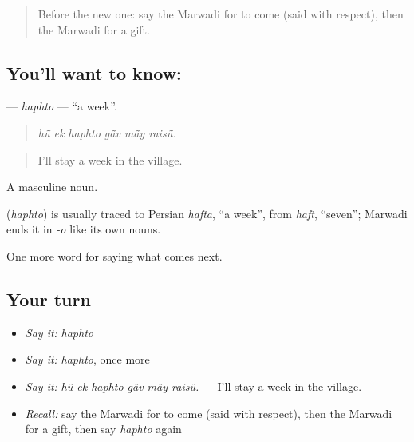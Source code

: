 \label{lesson:MW-C219-haphto}



\begin{quote}
Before the new one: say the Marwadi for to come (said with respect), then the Marwadi for a gift.
\end{quote}

\subsection*{You'll want to know: }
\textbf{} — \emph{haphto} — \textquotedblleft{}a week\textquotedblright{}.

\begin{quote}
     
\end{quote}

\begin{quote}
\emph{hū̃ ek haphto gā̃v mā̃y raisū̃.}
\end{quote}

\begin{quote}
I'll stay a week in the village.
\end{quote}

A masculine noun.

\begin{cousinweb}
\textbf{} (\emph{haphto}) is usually traced to Persian \emph{hafta}, \textquotedblleft{}a week\textquotedblright{}, from \emph{haft}, \textquotedblleft{}seven\textquotedblright{}; Marwadi ends it in \emph{-o} like its own nouns.
\end{cousinweb}

\begin{grammarlens}[title={What you've built}]
One more word for saying what comes next.
\end{grammarlens}

\subsection*{Your turn}
\begin{itemize}
\raggedright
  \item \emph{Say it:} \emph{haphto}
  \item \emph{Say it:} \emph{haphto}, once more
  \item \emph{Say it:} \emph{hū̃ ek haphto gā̃v mā̃y raisū̃.} — I'll stay a week in the village.
  \item \emph{Recall:} say the Marwadi for to come (said with respect), then the Marwadi for a gift, then say \emph{haphto} again
\end{itemize}

